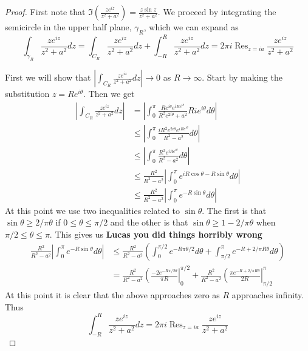 \documentclass[10pt]{article}
\DeclareMathOperator{\Res}{Res}
\theoremstyle{remark}
\theoremstyle{remark}
\begin{document}
\begin{proof}
  First note that $\Im(\frac{ze^{iz}}{z^2+a^2})=\frac{z\sin z}{z^2+a^2}$. We proceed
  by integrating the semicircle in the upper half plane, $\gamma_R$, which we can
  expand as
  \[
    \int_{\gamma_R}\frac{ze^{iz}}{z^2+a^2}dz=\int_{C_R}\frac{ze^{iz}}{z^2+a^2}dz+\int_{-R}^R\frac{ze^{iz}}{z^2+a^2} dz = 2\pi i\Res_{z=ia}\frac{ze^{iz}}{z^2+a^2}
  \]

  First we will show that $\left|\int_{C_R}\frac{ze^{iz}}{z^2+a^2}dz\right|\rightarrow 0$ as $R\rightarrow\infty$. Start by
  making the substitution $z=Re^{i\theta}$. Then we get
  \begin{align*}
    \left|\int_{C_R}\frac{ze^{iz}}{z^2+a^2}dz\right| &= \left|\int_0^\pi\frac{Re^{i\theta}e^{iRe^{i\theta}}}{R^2e^{2i\theta}+a^2}Rie^{i\theta}d\theta\right|\\
                                                  &\leq \left|\int_0^\pi\frac{iR^2e^{2i\theta}e^{iRe^{i\theta}}}{R^2-a^2}d\theta\right|\\
                                                  &\leq\left|\int_0^\pi\frac{R^2e^{iRe^{i\theta}}}{R^2-a^2}d\theta\right|\\
                                                  &\leq\frac{R^2}{R^2-a^2}\left|\int_0^\pi e^{iR\cos\theta-R\sin\theta}d\theta\right|\\
                                                  &\le\frac{R^2}{R^2-a^2}\left|\int_0^\pi e^{-R\sin\theta}d\theta\right|
  \end{align*}
  At this point we use two inequalities related to $\sin\theta$. The first
  is that $\sin\theta\geq 2/\pi\theta$ if $0\leq\theta\leq\pi/2$ and the other is that
  $\sin\theta\geq 1-2/\pi\theta$ when $\pi/2\leq\theta\leq\pi$. This gives us \textbf{Lucas you did things horribly wrong}
  \begin{align*}
    \frac{R^2}{R^2-a^2}\left|\int_0^\pi e^{-R\sin\theta}d\theta\right| &\leq\frac{R^2}{R^2-a^2}\left(\int_0^{\pi/2}e^{-R\pi\theta/2}d\theta+\int_{\pi/2}^{\pi}e^{-R+2/\pi R\theta}d\theta\right)\\
                                                               &=\frac{R^2}{R^2-a^2}\left(\frac{-2e^{-R\pi/2\theta}}{\pi R}\right|_0^{\pi/2}+\frac{R^2}{R^2-a^2}\left(\frac{\pi e^{-R+2/\pi R\theta}}{2R}\right|_{\pi/2}^\pi
  \end{align*}%
  At this point it is clear that the above approaches zero as $R$ approaches infinity.
  Thus
  \[
    \int_{-R}^R \frac{ze^{iz}}{z^2+a^2}dz = 2\pi i\Res_{z=ia}\frac{ze^{iz}}{z^2+a^2}
  \]


\end{proof}
\end{document}
